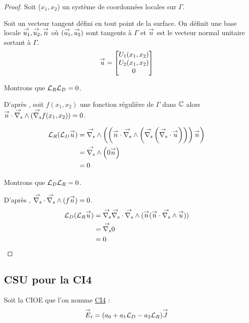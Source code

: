   \begin{proof}
    Soit (\(x_1,x_2\)) un système de coordonnées locales sur \(\Gamma\).

    Soit un vecteur tangent défini en tout point de la surface. On définit une base locale \(\vect{u_1},\vect{u_2},\vect{n}\) où \((\vect{u_1},\vect{u_2})\) sont tangents à \(\Gamma\) et \(\vn\) est le vecteur normal unitaire sortant à \(\Gamma\).
    \[
      \vect{u} = 
      \begin{bmatrix}
        U_1(x_1,x_2)
        \\
        U_2(x_1,x_2)
        \\
        0
      \end{bmatrix}
    \]


    Montrons que \(\LR\LD = 0\).

    D’après \cite[propriété A3.42, p.~1029]{bladel_electromagnetic_2007}, 
    soit \(f(x_1,x_2)\) une fonction régulière de \(\Gamma\) dans \(\CC\) alors \(\vn \cdot \vrots(\vgrads f(x_1,x_2)) = 0\).

    \begin{align*}
      \LR(\LD \vu) &= \vrots \left(\left(\vn \cdot \vrots \left( \vgrads \left(\vdivs \vu\right)\right)\right)\vn \right)
      \\
      &= \vrots \left(0\vn \right) 
      \\
      &= 0
    \end{align*}

    Montrons que \(\LD\LR = 0\).

    D’après \cite[p.~1029, A3.43]{bladel_electromagnetic_2007}, \(\vdivs \vrots (f\vn) = 0\).
    \begin{align*}
      \LD(\LR \vu) &= \vgrads \vdivs \vrots (\vn (\vn \cdot \vrots \vu))
      \\
      &= \vgrads 0
      \\
      &= 0
    \end{align*}
  \end{proof}

\subsection{CSU pour la CI4}
  Soit la CIOE que l'on nomme \hyperlink{ci4}{CI4} :
  \begin{equation}
    \label{eq:unicite:ci4:ci4}
    \vE_t = (a_0 + a_1 \LD - a_2 \LR ) \vJ
  \end{equation}

